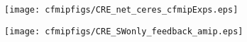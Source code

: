 \documentclass[varwidth, border=10pt]{standalone}
\begin{document}
\begin{figure}
  \centering
  \begin{subfigure}{0.48\textwidth}
  \texttt{[image: cfmipfigs/CRE\_net\_ceres\_cfmipExps.eps]}
\end{subfigure}
\begin{subfigure}{0.48\textwidth}
  \texttt{[image: cfmipfigs/CRE\_SWonly\_feedback\_amip.eps]}
\end{subfigure}
\end{figure}
\end{document}
